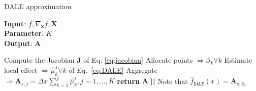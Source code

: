 \documentclass[wcp]{jmlr}
\newcommand{\dale}{\hat{f}_{\mathtt{DALE}}}
\newcommand{\Jac}{\mathbf{J}}
\begin{document}
\begin{algorithm}[h]
\caption{DALE approximation}
\label{alg:dale} \textbf{Input}: \( f, \nabla_{\mathbf{x}} f, \mathbf{X} \) \\ \textbf{Parameter}: \( K \) \\ \textbf{Output}: \(\mathbf{A}\)
\begin{algorithmic}[1]
  \STATE Compute the Jacobian \(\Jac\) of Eq. \eqref{eq:jacobian}
  \STATE Allocate points \( \Rightarrow \mathcal{S}_k \forall k \)
  \STATE Estimate local effect \( \Rightarrow \hat{\mu}_k^s \forall k\) of Eq.~\eqref{eq:DALE}
  \STATE Aggregate \( \Rightarrow \mathbf{A}_{s,j} = \Delta x\sum_{k=1}^{j} \hat{\mu}_k^s, j = 1, \ldots, K \)
  \ENDFOR
  \STATE \textbf{return} \(\mathbf{A}\) \textbf{||} Note that \( \dale(x) = \mathbf{A}_{s,k_x} \)
\end{algorithmic}
\end{algorithm}
\end{document}
